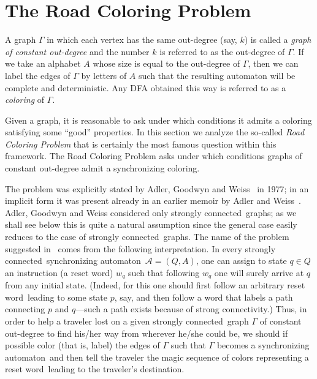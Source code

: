 \documentclass{irmaart}
\newcommand{\san}{synchronizing au\-tom\-a\-ton}
\newcommand{\sw}{reset word}
\newcommand{\scn}{strongly connected}
\theoremstyle{plain}
\begin{document}
\section{The Road Coloring Problem}
\label{KV:sec:rcp}

A graph $\Gamma$ in which each vertex has the same out-degree (say, $k$) is called a \emph{graph of constant out-degree} and the number $k$ is referred to as the out-degree of $\Gamma$. If we take an alphabet $A$ whose size is equal to the
out-degree of $\Gamma$, then we can label the edges of $\Gamma$ by letters of $A$ such that the resulting automaton will be complete and
deterministic. Any DFA obtained this way is referred to as a \emph{coloring} of $\Gamma$.

Given a graph, it is reasonable to ask under which conditions it admits a coloring satisfying some ``good'' properties. In this section we
analyze the so-called \emph{Road Coloring Problem} that is certainly the most famous question within this
framework. The Road Coloring Problem asks under which conditions graphs of constant out-degree admit a synchronizing coloring.

The problem was explicitly stated by Adler, Goodwyn and Weiss~\cite{Adler&Goodwyn&Weiss:1977} in 1977; in an implicit form it was present
already in an earlier memoir by Adler and Weiss~\cite{Adler&Weiss:1970}. Adler, Goodwyn and Weiss considered only \scn\ graphs; as we shall
see below this is quite a natural assumption since the general case easily reduces to the case of \scn\ graphs. The name of the problem
suggested in~\cite{Adler&Goodwyn&Weiss:1977} comes from the following interpretation. In every \scn\ \san\ $\mathcal{A}=(Q,A)$, one can
assign to state $q\in Q$ an instruction (a \sw) $w_q$ such that following $w_q$ one will surely arrive at $q$ from any initial state.
(Indeed, for this one should first follow an arbitrary \sw\ leading to some state $p$, say, and then follow a word that labels a path
connecting $p$ and $q$---such a path exists because of strong connectivity.) Thus, in order to help a traveler lost on a given \scn\ graph
$\Gamma$ of constant out-degree to find his/her way from wherever he/she could be, we should if possible color (that is, label) the edges
of $\Gamma$ such that $\Gamma$ becomes a \san\ and then tell the traveler the magic sequence of colors representing a \sw\ leading to the
traveler's destination.
\end{document}

